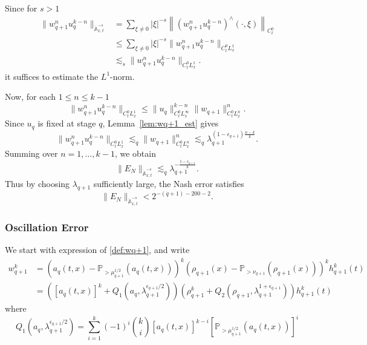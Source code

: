 \documentclass[12pt,reqno,letterpaper]{amsart}
\numberwithin{equation}{section}
\newcommand{\1}{{\bf 1}}
\newcommand{\2}{{\bf 2}}
\theoremstyle{remark}
\theoremstyle{remark}
\begin{document}
Since for $s > 1$
\[
\begin{aligned}
    \|w_{q+1}^n u_q^{k-n}\|_{\dot{\mathbb A}_{x,t}^{-s}}
    &=
    \sum_{\xi\neq0} |\xi|^{-s} \left\|(w_{q+1}^n u_q^{k-n})^{\wedge}(\cdot,\xi)\right\|_{C_t^0} \\
    &\le
    \sum_{\xi\neq0} |\xi|^{-s} \|w_{q+1}^n u_q^{k-n}\|_{C_t^0L_x^1} \\
    &\lesssim_s
    \|w_{q+1}^n u_q^{k-n}\|_{C_t^0L_x^1}.
\end{aligned}
\]
it suffices to estimate the $L^1$-norm.

Now, for each $1 \leq n \leq k - 1$
\[
    \|w_{q+1}^n u_q^{k-n}\|_{C_t^0L_x^1}
    \le
    \|u_q\|_{C_t^0L_x^\infty}^{k-n}
    \|w_{q+1}\|_{C_t^0L_x^n}^n.
\]
Since $u_q$ is fixed at stage $q$, Lemma~\ref{lem:wq+1_est} gives 
\[
\|w_{q+1}^n u_q^{k-n}\|_{C_t^0L_x^1}
\lesssim_q
\|w_{q+1}\|_{C_t^0L_x^n}^n
\lesssim_q
\lambda_{q+1}^{(1-\epsilon_{q+1})\frac{n-k}{k}}.
\]
Summing over $n=1,\ldots,k-1$, we obtain
\[
\|E_N\|_{\dot{\mathbb A}_{x,t}^{-s}}
\lesssim_{q}
\lambda_{q+1}^{-\frac{1-\epsilon_{q+1}}{k}}.
\]
Thus by choosing $\lambda_{q+1}$ sufficiently large, the Nash error satisfies
\begin{equation}\label{eq:EN-decay}
    \|E_N\|_{\dot{\mathbb A}_{x,t}^{-s}} < 2^{-(q+1)-200-2}.
\end{equation}
\subsubsection*{Oscillation Error}


We start with expression of \eqref{def:wq+1}, and write
\begin{equation*}
    \begin{split}
        w_{q+1}^k &=\left( a_q(t,x)-\mathbb{P}_{>\mu_{q+1}^{1/2}}\left( a_q(t,x)\right)  \right)^k \left( \rho_{q+1}(x) -\mathbb{P}_{>\nu_{q+1}} (\rho_{q+1}(x)) \right)^k h_{q+1}^k(t)
        \\
        &= \left([a_q(t,x)]^k +Q_1(a_q,\lambda_{q+1}^{\epsilon_{q+1}/2}) \right) \left( \rho_{q+1}^k +Q_2(\rho_{q+1},\lambda^{1+\epsilon_{q+1}}_{q+1})\right)h_{q+1}^k(t)
    \end{split}
\end{equation*}
where 
\begin{equation*}
    Q_1(a_q,\lambda_{q+1}^{\epsilon_{q+1}/2})=\sum_{i=1}^k(-1)^i \binom{k}{i}  [a_q(t,x)]^{k-i} \left[ \mathbb{P}_{>\mu_{q+1}^{1/2}} (a_q(t, x))  \right]^i 
\end{equation*}
\end{document}
